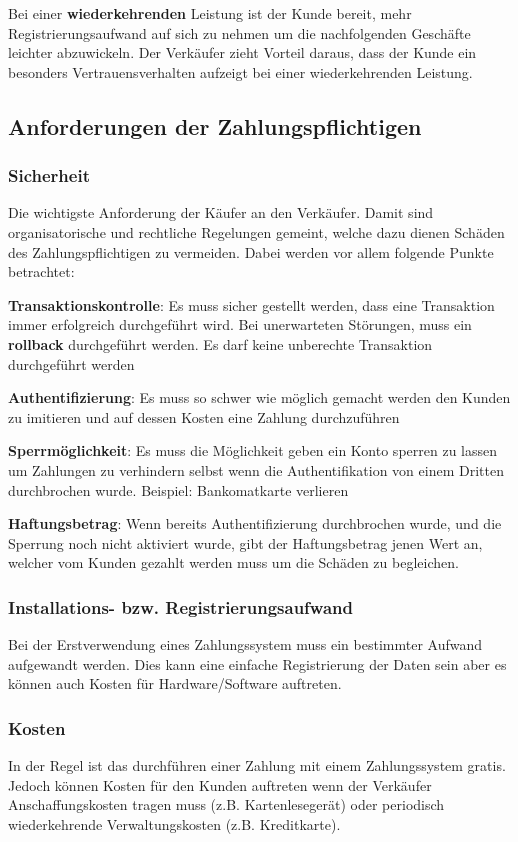 Bei einer \textbf{wiederkehrenden} Leistung ist der Kunde bereit, mehr Registrierungsaufwand auf sich zu nehmen um die nachfolgenden Geschäfte leichter abzuwickeln. Der Verkäufer zieht Vorteil daraus, dass der Kunde ein besonders Vertrauensverhalten aufzeigt bei einer wiederkehrenden Leistung. 

\subsection{Anforderungen der Zahlungspflichtigen}
\subsubsection{Sicherheit}
Die wichtigste Anforderung der Käufer an den Verkäufer. Damit sind organisatorische und rechtliche Regelungen gemeint, welche dazu dienen Schäden des Zahlungspflichtigen zu vermeiden. Dabei werden vor allem folgende Punkte betrachtet:

\textbf{Transaktionskontrolle}: Es muss sicher gestellt werden, dass eine Transaktion immer erfolgreich durchgeführt wird. Bei unerwarteten Störungen, muss ein \textbf{rollback} durchgeführt werden. Es darf keine unberechte Transaktion durchgeführt werden

\textbf{Authentifizierung}: Es muss so schwer wie möglich gemacht werden den Kunden zu imitieren und auf dessen Kosten eine Zahlung durchzuführen

\textbf{Sperrmöglichkeit}: Es muss die Möglichkeit geben ein Konto sperren zu lassen um Zahlungen zu verhindern selbst wenn die Authentifikation von einem Dritten durchbrochen wurde. Beispiel: Bankomatkarte verlieren

\textbf{Haftungsbetrag}: Wenn bereits Authentifizierung durchbrochen wurde, und die Sperrung noch nicht aktiviert wurde, gibt der Haftungsbetrag jenen Wert an, welcher vom Kunden gezahlt werden muss um die Schäden zu begleichen.

\subsubsection{Installations- bzw. Registrierungsaufwand}
Bei der Erstverwendung eines Zahlungssystem muss ein bestimmter Aufwand aufgewandt werden. Dies kann eine einfache Registrierung der Daten sein aber es können auch Kosten für Hardware/Software auftreten.

\subsubsection{Kosten}
In der Regel ist das durchführen einer Zahlung mit einem Zahlungssystem gratis. Jedoch können Kosten für den Kunden auftreten wenn der Verkäufer Anschaffungskosten tragen muss (z.B. Kartenlesegerät) oder periodisch wiederkehrende Verwaltungskosten (z.B. Kreditkarte).

